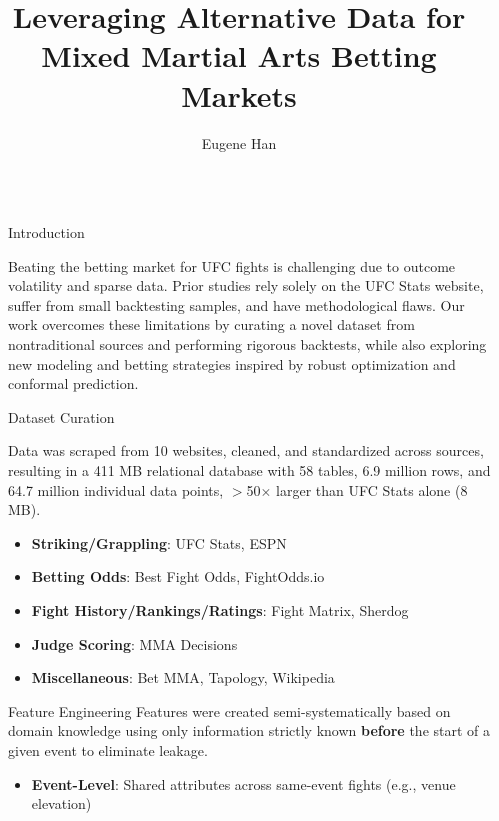 \documentclass[final]{beamer}
\title{Leveraging Alternative Data for Mixed Martial Arts Betting Markets}
\author{Eugene Han}
\institute[shortinst]{Yale University, Department of Statistics \& Data Science}
\newlength{\sepwidth}
\newlength{\colwidth}
\newcommand{\separatorcolumn}{\begin{column}{\sepwidth}\end{column}}
\begin{document}
\begin{frame}[t]
\begin{columns}[t]
\separatorcolumn

\begin{column}{\colwidth}
  \vspace{-30pt}
  \begin{block}{Introduction}

    Beating the betting market for UFC fights is challenging due to outcome volatility and sparse data. Prior studies rely solely on the UFC Stats website, suffer from small backtesting samples, and have methodological flaws. Our work overcomes these limitations by curating a novel dataset from nontraditional sources and performing rigorous backtests, while also exploring new modeling and betting strategies inspired by robust optimization and conformal prediction.

  \end{block}

  \begin{block}{Dataset Curation}

    Data was scraped from 10 websites, cleaned, and standardized across sources, resulting in a 411 MB relational database with 58 tables, 6.9 million rows, and 64.7 million individual data points, $>$50$\times$ larger than UFC Stats alone (8 MB).
    \begin{itemize}
        \item \textbf{Striking/Grappling}: UFC Stats, ESPN
        \item \textbf{Betting Odds}: Best Fight Odds, FightOdds.io
        \item \textbf{Fight History/Rankings/Ratings}: Fight Matrix, Sherdog
        \item \textbf{Judge Scoring}: MMA Decisions
        \item \textbf{Miscellaneous}: Bet MMA, Tapology, Wikipedia
    \end{itemize}

  \end{block}

  \begin{block}{Feature Engineering}
    Features were created semi-systematically based on domain knowledge using only information strictly known \textbf{before} the start of a given event to eliminate leakage.
    
    \begin{itemize}
        \item \textbf{Event-Level}: Shared attributes across same-event fights (e.g., venue elevation)


\end{itemize}
\end{block}
\end{column}
\end{columns}
\end{frame}
\end{document}
